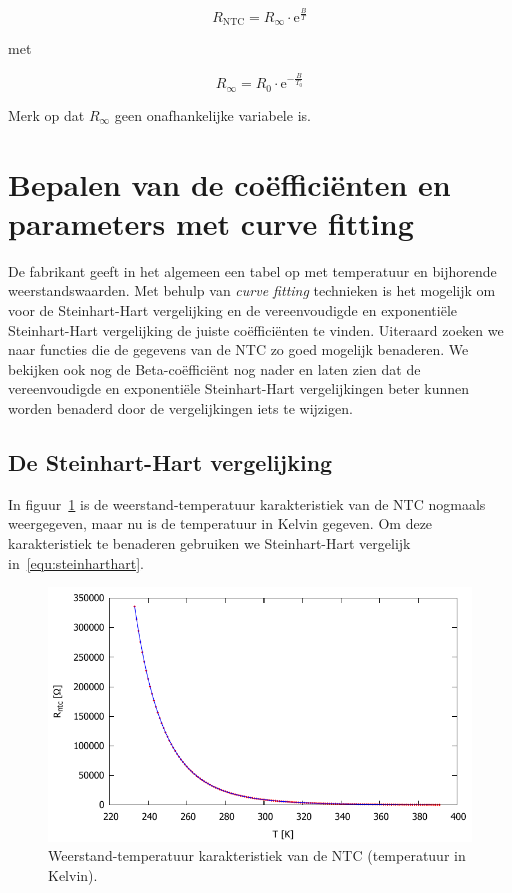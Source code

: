 \documentclass[12pt,a4paper,final,twoside,fleqn]{article}
\begin{document}
\begin{equation}
\label{equ:betafuncexp}
R_\text{NTC} = R_\infty \cdot\text{e}^\frac{B}{T}
\end{equation}

met

\begin{equation}
R_\infty = R_0\cdot \text{e}^{-\frac{B}{T_0}}
\end{equation}

Merk op dat $R_\infty$ geen onafhankelijke variabele is.

\section{Bepalen van de co\"effici\"enten en parameters met curve fitting}
De fabrikant geeft in het algemeen een tabel op met temperatuur en bijhorende
weerstandswaarden. Met behulp van \textsl{curve fitting} technieken is het
mogelijk om voor de Steinhart-Hart vergelijking en de vereenvoudigde en 
exponenti\"ele Steinhart-Hart vergelijking de juiste co\"effici\"enten te
vinden. Uiteraard zoeken we naar functies die de gegevens van de NTC zo goed
mogelijk benaderen. We bekijken ook nog de Beta-co\"effici\"ent nog nader
en laten zien dat de vereenvoudigde en exponenti\"ele Steinhart-Hart
vergelijkingen beter kunnen worden benaderd door de vergelijkingen iets te
wijzigen.

\subsection{De Steinhart-Hart vergelijking}
In figuur~\ref{fig:ntc_ntc_plot_kelvin_fig} is de weerstand-temperatuur karakteristiek
van de NTC nogmaals weergegeven, maar nu is de temperatuur in Kelvin gegeven. Om
deze karakteristiek te benaderen gebruiken we Steinhart-Hart vergelijk in~\eqref{equ:steinharthart}.
\begin{figure}[ht!]
\centering
\includegraphics[scale=1]{gnuplot/ntc_ntc_plot_kelvin_fig}
\caption{Weerstand-temperatuur karakteristiek van de NTC (temperatuur in Kelvin).}
\label{fig:ntc_ntc_plot_kelvin_fig}
\end{figure}
\end{document}
